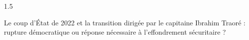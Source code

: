 \documentclass[12pt]{article}
\begin{document}
\begin{spacing}{1.5}

Le coup d'État de 2022 et la transition dirigée par le capitaine Ibrahim Traoré : rupture démocratique ou réponse nécessaire à l'effondrement sécuritaire ?

\quad

\end{spacing}
\end{document}
